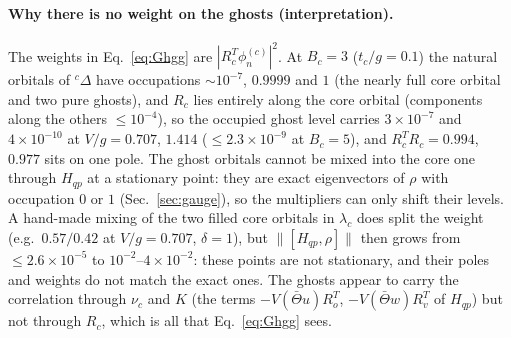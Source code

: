 \documentclass[11pt]{article}
\begin{document}
\paragraph{Why there is no weight on the ghosts (interpretation).} The weights in Eq.~\eqref{eq:Ghgg} are $|R_c^T\phi^{(c)}_n|^2$. At $B_c=3$ ($t_c/g=0.1$) the natural orbitals of ${}^c\Delta$ have occupations $\sim10^{-7}$, $0.9999$ and $1$ (the nearly full core orbital and two pure ghosts),
and $R_c$ lies entirely along the core orbital (components along the others $\le10^{-4}$), so the occupied ghost level carries $3\times10^{-7}$ and $4\times10^{-10}$ at $V/g=0.707$, $1.414$ ($\le2.3\times10^{-9}$ at $B_c=5$), and $R_c^TR_c=0.994$, $0.977$ sits on one pole.
The ghost orbitals cannot be mixed into the core one through $H_{qp}$ at a stationary point: they are exact eigenvectors of $\rho$ with occupation $0$ or $1$ (Sec.~\ref{sec:gauge}), so the multipliers can only shift their levels. A hand-made mixing of the two filled core orbitals in $\lambda_c$ does split the weight (e.g.\ $0.57/0.42$ at $V/g=0.707$, $\delta=1$), but $\|[H_{qp},\rho]\|$ then grows from $\le2.6\times10^{-5}$ to $10^{-2}$--$4\times10^{-2}$: these points are not stationary, and their poles and weights do not match the exact ones.
The ghosts appear to carry the correlation through $\nu_c$ and $K$ (the terms $-V(\bar\Theta u)R_o^T$, $-V(\bar\Theta w)R_v^T$ of $H_{qp}$) but not through $R_c$, which is all that Eq.~\eqref{eq:Ghgg} sees.
\end{document}
